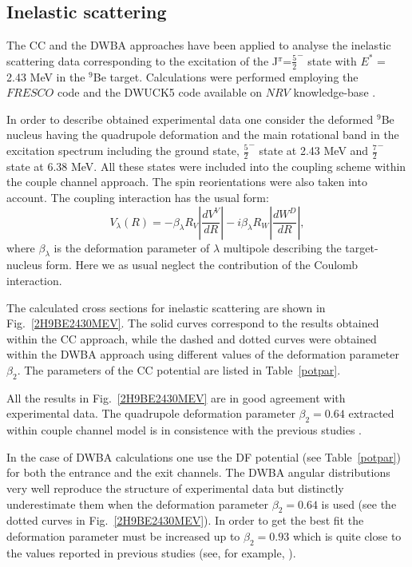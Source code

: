 \documentclass[10pt]{iopart}
\begin{document}
\subsection{Inelastic scattering}
The CC and the DWBA approaches have been applied to analyse the inelastic scattering data corresponding to the excitation of the J$^{\pi}$=$\frac{5}{2}^-$ state with $E^*$ = 2.43 MeV in the ${}^9$Be target. Calculations were performed employing the $FRESCO$ code \cite{fresco} and the DWUCK5 code available on $NRV$ knowledge-base \cite{nrv}.

In order to describe obtained experimental data one consider the deformed ${}^9$Be nucleus having the quadrupole deformation and the main rotational band in the excitation spectrum including the ground state, $\frac{5}{2}^-$ state at 2.43 MeV and $\frac{7}{2}^-$ state at 6.38 MeV. All these states were included into the coupling scheme within the couple channel approach. The spin reorientations were also taken into account. The coupling interaction has the usual form:
\begin{equation}
V_\lambda(R)=-\beta_\lambda R_V \left|\frac{d V^V}{dR}\right| - i \beta_\lambda R_W \left|\frac{d W^D}{dR}\right|,
\end{equation}
where $\beta_\lambda$ is the deformation parameter of $\lambda$ multipole describing the target-nucleus form. Here we as usual neglect the contribution of the Coulomb interaction.

The calculated cross sections for inelastic scattering are shown in Fig.~\ref{2H9BE2430MEV}. The solid curves correspond to the results obtained within the CC approach, while the dashed and dotted curves were obtained within the DWBA approach using  different values of the deformation parameter $\beta_2$. The parameters of the CC potential are listed in Table~\ref{potpar}.

All the results in Fig.~\ref{2H9BE2430MEV} are in good agreement with experimental data. The quadrupole deformation parameter $\beta_2 = 0.64$ extracted within couple channel model is in consistence with the previous studies \cite{lukyanov2014, harakeh1980}.

In the case of DWBA calculations one use the DF potential (see Table~\ref{potpar}) for both the entrance and the exit channels. The DWBA angular distributions very well reproduce the structure of experimental data but distinctly underestimate them when the deformation parameter $\beta_2 = 0.64$ is used (see the dotted curves in Fig.~\ref{2H9BE2430MEV}). In order to get the best fit the deformation parameter must be increased up to $\beta_2 = 0.93$ which is quite close to the values reported in previous studies (see, for example, \cite{bodek1989, votava1973}).
\end{document}
